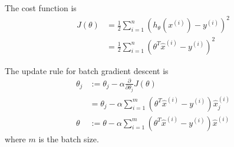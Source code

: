\begin{answer}

The cost function is
\begin{align*}
    J(\theta) &= \frac{1}{2} \sum_{i=1}^n \left( h_\theta(x^{(i)}) - y^{(i)} \right)^2 \\
    &= \frac{1}{2} \sum_{i=1}^n \left( \theta^T \hat{x}^{(i)} - y^{(i)} \right)^2
\end{align*}

The update rule for batch gradient descent is
\begin{align*}
    \theta_j &:= \theta_j - \alpha \frac{\partial}{\partial \theta_j} J(\theta) \\
    &= \theta_j - \alpha \sum_{i=1}^m \left( \theta^T \hat{x}^{(i)} - y^{(i)} \right) \hat{x}_j^{(i)} \\
    \theta &:= \theta - \alpha \sum_{i=1}^m \left( \theta^T \hat{x}^{(i)} - y^{(i)} \right) \hat{x}^{(i)}
\end{align*}
where $m$ is the batch size.
\end{answer}
